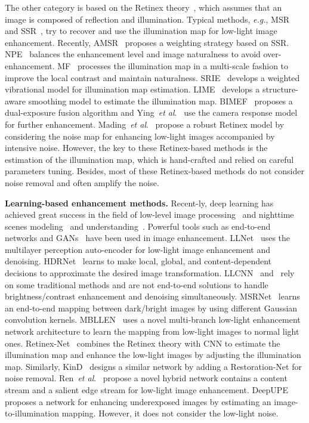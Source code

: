 The other category is based on the Retinex theory~\cite{land1977retinex}, which assumes that an image is composed of reflection and illumination. Typical methods, \textit{e.g.}, MSR~\cite{jobson1997multiscale} and SSR~\cite{jobson1997properties}, try to recover and use the illumination map for low-light image enhancement. Recently, AMSR~\cite{lee2013amsr} proposes a weighting strategy based on SSR. NPE~\cite{wang2013naturalness} balances the enhancement level and image naturalness to avoid over-enhancement. MF~\cite{fu2016mf} processes the illumination map in a multi-scale fashion to improve the local contrast and maintain naturalness. SRIE~\cite{fu2016srie} develops a weighted vibrational model for illumination map estimation. LIME~\cite{guo2017lime} develops a structure-aware smoothing model to estimate the illumination map. BIMEF~\cite{ying2017bio} proposes a dual-exposure fusion algorithm and Ying~\textit{et al}.~\cite{ying2017newiccv} use the camera response model for further enhancement. Mading~\textit{et al}.~\cite{li2018structure} propose a robust Retinex model by considering the noise map for enhancing low-light images accompanied by intensive noise. However, the key to these Retinex-based methods is the estimation of the illumination map, which is hand-crafted and relied on careful parameters tuning. Besides, most of these Retinex-based methods do not consider noise removal and often amplify the noise.

{\bf Learning-based enhancement methods.}
Recent-ly, deep learning has achieved great success in the field of low-level image processing~\cite{sharma2018classification} and
nighttime scenes modeling~\cite{radenovic2016dusk} and understanding~\cite{daytime:2:nighttime,GCMA:UAE:NighttimeSegmentation19}.
Powerful tools such as end-to-end networks and GANs~\cite{goodfellow2014generative} have been used in image enhancement.
LLNet~\cite{lore2017llnet} uses the multilayer perception auto-encoder for low-light image enhancement and denoising.
HDRNet~\cite{gharbi2017deep} learns to make local, global, and content-dependent decisions to approximate the desired image transformation. LLCNN~\cite{tao2017llcnn} and~\cite{tao2017low} rely on some traditional methods and are not end-to-end solutions to handle brightness/contrast enhancement and denoising simultaneously. MSRNet~\cite{shen2017msr} learns an end-to-end mapping between dark/bright images by using different Gaussian convolution kernels.
MBLLEN~\cite{lvmbllen} uses a novel multi-branch low-light enhancement network architecture to learn the mapping from low-light images to normal light ones.
Retinex-Net~\cite{Chen2018Retinex} combines the Retinex theory with CNN to estimate the illumination map and enhance the low-light images by adjusting the illumination map. Similarly, KinD~\cite{zhang2019kindling} designs a similar network by adding a Restoration-Net for noise removal. Ren~\textit{et al}.~\cite{ren2019low} propose a novel hybrid network contains a content stream and a salient edge stream for low-light image enhancement. DeepUPE~\cite{wang2019underexposed} proposes a network for enhancing underexposed images by estimating an image-to-illumination mapping. However, it does not consider the low-light noise.

